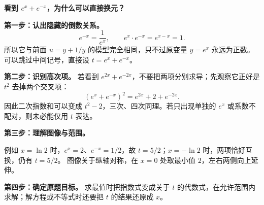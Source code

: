 \begin{explanationbox}
\textbf{\textcolor{CExplanation}{看到 $e^x+e^{-x}$，为什么可以直接换元？}}

\textbf{第一步：认出隐藏的倒数关系。}
\[
e^{-x}=\frac1{e^x},\qquad e^x\cdot e^{-x}=e^{x-x}=1.
\]
所以它与前面 $u=y+1/y$ 的模型完全相同，只不过原变量 $y=e^x$ 永远为正数。可以跳过中间记号，直接设 $t=e^x+e^{-x}$。

\textbf{第二步：识别高次项。} 若看到 $e^{2x}+e^{-2x}$，不要把两项分别求导；先观察它正好是 $t^2$ 去掉两个交叉项：
\[
(e^x+e^{-x})^2=e^{2x}+2+e^{-2x}.
\]
因此二次指数和可以变成 $t^2-2$，三次、四次同理。若只出现单独的 $e^x$ 或系数不配对，则未必能仅用 $t$ 表达。

\textbf{第三步：理解图像与范围。}

例如 $x=\ln2$ 时，$e^x=2$、$e^{-x}=1/2$，故 $t=5/2$；$x=-\ln2$ 时，两项恰好互换，仍有 $t=5/2$。
图像关于纵轴对称，在 $x=0$ 处取最小值 $2$，左右两侧向上延伸。

\textbf{第四步：确定原题目标。} 求最值时把指数式变成关于 $t$ 的代数式，在允许范围内求解；解方程或不等式时还要把 $t$ 的结果还原成 $x$。
\end{explanationbox}
\clearpage
